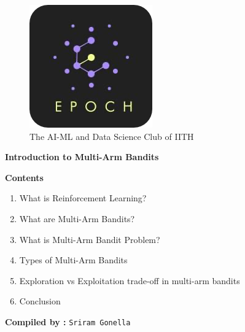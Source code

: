 \documentclass{article}
\begin{document}
\begin{center}
\begin{figure}
\centering
\includegraphics[scale = 0.35]{image.png}\\
The AI-ML and Data Science Club of IITH
\end{figure}
\end{center}

\begin{center}
   {\LARGE{\textbf{Introduction to Multi-Arm Bandits}}} 
\end{center}


\graphicspath{{./media/}}
\begin{center}
    \large{\textbf{{Contents}}}
\end{center}



\begin{enumerate}
 \item {What is Reinforcement Learning?}\\
 \item {What are Multi-Arm Bandits?}\\
 \item {What is Multi-Arm Bandit Problem?}\\
 \item {Types of Multi-Arm Bandits}\\
 \item {Exploration vs Exploitation trade-off in multi-arm bandits
}\\
 \item {Conclusion}\\
\end{enumerate}

\begin{center}
    \textbf{Compiled by :}
    \texttt{Sriram Gonella}
\end{center}


\newpage
\end{document}
